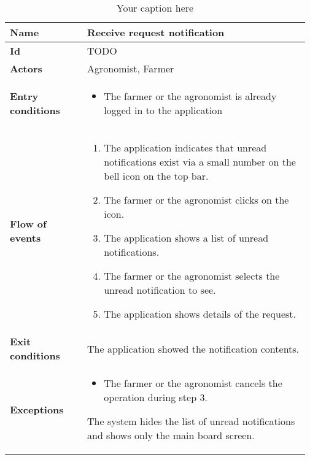 \begin{table}[H]
    \centering
	\begin{tabular}{@{}p{0.25\linewidth} p{0.72\linewidth}@{}}
		\toprule
		\textbf{Name}               & Receive request notification\\
		\midrule
		\textbf{Id}                 & TODO\\
		\midrule
		\textbf{Actors}             & Agronomist, Farmer\\
		\midrule
		
		\textbf{Entry conditions}   & \begin{itemize}[leftmargin=.4cm,noitemsep,topsep=0pt,before=\vspace{-3mm},after=\vspace{-4mm}]
		    \item The farmer or the agronomist is already logged in to the application
		\end{itemize}\\
		\midrule
		
		\textbf{Flow of events}     & \begin{enumerate}[leftmargin=.4cm,noitemsep,topsep=0pt,before=\vspace{-3mm},after=\vspace{-4mm}]
		    \item The application indicates that unread notifications exist via a small number on the bell icon on the top bar.
		    \item The farmer or the agronomist clicks on the icon.
		    \item The application shows a list of unread notifications.
		    \item The farmer or the agronomist selects the unread notification to see.
		    \item The application shows details of the request.
		\end{enumerate}\\
		\midrule
		\textbf{Exit conditions}    & The application showed the notification contents. \\
		\midrule
		
		\textbf{Exceptions}         & \begin{itemize}[leftmargin=.4cm,noitemsep,topsep=0pt,before=\vspace{-3mm}]
		   \item The farmer or the agronomist cancels the operation during step 3.
		\end{itemize}
	    The system hides the list of unread notifications and shows only the main board screen.\\
		\bottomrule
	\end{tabular}
	\caption{Your caption here} 
\end{table}


